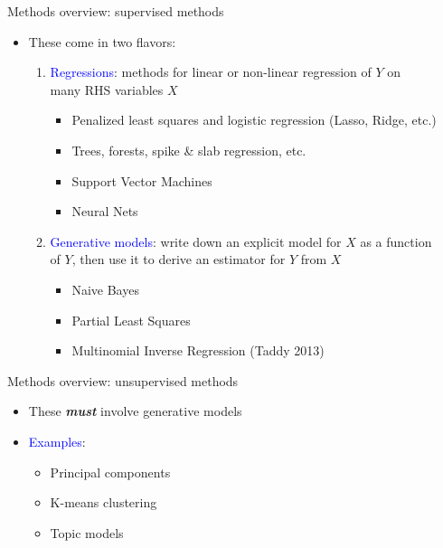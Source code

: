 \documentclass[english]{beamer}
\begin{document}
\begin{frame}{Methods overview: supervised methods}
\begin{itemize}
\setlength{\itemsep}{1em}
\item These come in two flavors:
\vspace{7pt}

\begin{enumerate}
\setlength{\itemsep}{1em}
\setlength{\itemindent}{-0.8em}
\item \textcolor{blue}{Regressions}: methods for linear or non-linear regression of $Y$ on\\
\hspace{-7pt}many RHS variables $X$

\begin{itemize}
\setlength{\itemindent}{-1.5em}
\setlength{\itemsep}{0.3em}
\item Penalized least squares and logistic regression (Lasso, Ridge, etc.)
\item Trees, forests, spike \& slab regression, etc.
\item Support Vector Machines
\item Neural Nets
\end{itemize}

\pause

\item\textcolor{blue}{Generative models}: write down an explicit model for $X$ as a function\\
\hspace{-7pt}of $Y$, then use it to derive an estimator for $Y$ from $X$

\begin{itemize}
\setlength{\itemindent}{-1.5em}
\setlength{\itemsep}{0.3em}
\item Naive Bayes
\item Partial Least Squares
\item Multinomial Inverse Regression (Taddy 2013)
\end{itemize}

\end{enumerate}
\end{itemize}
\end{frame}

\begin{frame}{Methods overview: unsupervised methods}
\begin{itemize}
\setlength{\itemsep}{1em}
\item These \textit{\textbf{must}} involve generative models
\item\textcolor{blue}{Examples}:
\vspace{4pt}
\begin{itemize}
\setlength{\itemindent}{-1.5em}
\setlength{\itemsep}{0.3em}
\item Principal components
\item K-means clustering
\item Topic models
\end{itemize}
\end{itemize}
\end{frame}
\end{document}
